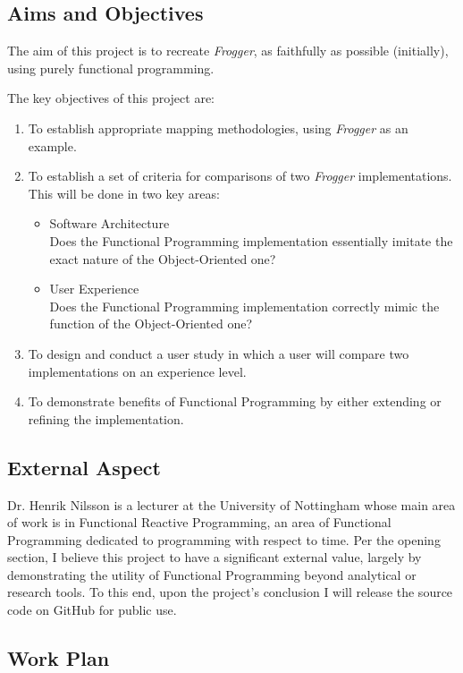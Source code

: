 \documentclass[10pt]{article}
\begin{document}
\subsection*{Aims and Objectives}
The aim of this project is to recreate \textit{Frogger}, as faithfully as possible (initially), using purely functional programming.

The key objectives of this project are:
\begin{enumerate}
  \item To establish appropriate mapping methodologies, using \textit{Frogger} as an example.
  \item To establish a set of criteria for comparisons of two \textit{Frogger} implementations.\\
        This will be done in two key areas:
    \begin{itemize}
      \item Software Architecture\\
        Does the Functional Programming implementation essentially imitate the exact nature of the Object-Oriented one?
      \item User Experience\\
        Does the Functional Programming implementation correctly mimic the function of the Object-Oriented one?
    \end{itemize}
  \item To design and conduct a user study in which a user will compare two implementations on an experience level.
  \item To demonstrate benefits of Functional Programming by either extending or refining the implementation.
\end{enumerate}

\subsection*{External Aspect}
Dr. Henrik Nilsson is a lecturer at the University of Nottingham whose main area of work is in Functional Reactive Programming\cite{henrikssite}, an area of Functional Programming dedicated to programming with respect to time\cite{frp}.
Per the opening section, I believe this project to have a significant external value, largely by demonstrating the utility of Functional Programming beyond analytical or research tools.
To this end, upon the project's conclusion I will release the source code on GitHub for public use.

\subsection*{Work Plan}
\end{document}
